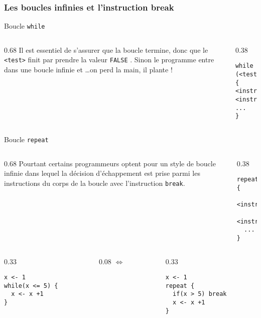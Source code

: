 \documentclass[10pt]{beamer}
\begin{document}
\begin{frame}[fragile]
  \frametitle{Les boucles infinies et l'instruction break}

  \begin{block}{Boucle \texttt{while}}
\begin{columns}[c]
\begin{column}{0.68\textwidth}
    Il est essentiel de s'assurer que la boucle termine, donc que le \texttt{<test>} finit par prendre la valeur \texttt{FALSE} .
  Sinon le programme entre dans une \alert{boucle infinie} et \dots on perd la main, il plante !

\end{column}
\begin{column}{0.38\textwidth}
  \begin{lstlisting}[style=editor]
while (<test>) {
<instruction>
<instruction>
...
}
  \end{lstlisting}
\end{column}
\end{columns}
\end{block}

  \begin{block}{Boucle \texttt{repeat}}
\begin{columns}[c]
\begin{column}{0.68\textwidth}
  Pourtant certains programmeurs optent pour un style de boucle infinie dans lequel la décision d'échappement est prise parmi les instructions du corps de la boucle avec l'instruction \texttt{break}.
\end{column}
\begin{column}{0.38\textwidth}
  \begin{lstlisting}[style=editor]
repeat {
  <instruction>
  <instruction>
  ...
}
  \end{lstlisting}
\end{column}
\end{columns}

  \end{block}
\begin{columns}[c]
\begin{column}{0.33\textwidth}
  \begin{lstlisting}[style=editor]
x <- 1
while(x <= 5) {
  x <- x +1
}
\end{lstlisting}
\end{column}
\begin{column}{0.08\textwidth}
  $\Longleftrightarrow$
\end{column}
\begin{column}{0.33\textwidth}
\begin{lstlisting}[style=editor]
x <- 1
repeat {
  if(x > 5) break
  x <- x +1
}
\end{lstlisting}

\end{column}
\end{columns}

\end{frame}
\end{document}
